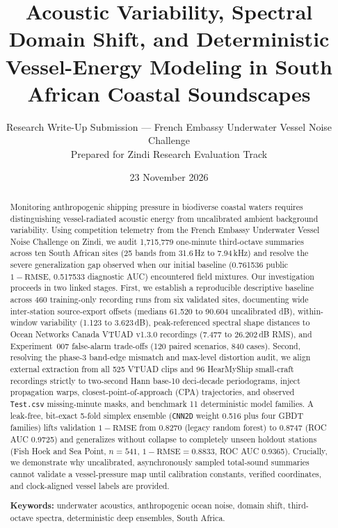 \documentclass[10pt,a4paper]{article}
\title{\vspace{-1.1em}\Large\textbf{Acoustic Variability, Spectral Domain Shift, and Deterministic Vessel-Energy Modeling in South African Coastal Soundscapes}}
\author{Research Write-Up Submission --- French Embassy Underwater Vessel Noise Challenge \\ \small Prepared for Zindi Research Evaluation Track}
\date{23 November 2026}
\begin{document}
\maketitle
\vspace{-1.0em}

\begin{abstract}
Monitoring anthropogenic shipping pressure in biodiverse coastal waters requires distinguishing vessel-radiated acoustic energy from uncalibrated ambient background variability. Using competition telemetry from the French Embassy Underwater Vessel Noise Challenge on Zindi, we audit 1,715,779 one-minute third-octave summaries across ten South African sites (25 bands from 31.6\,Hz to 7.94\,kHz) and resolve the severe generalization gap observed when our initial baseline (0.761536 public $1 - \mathrm{RMSE}$, 0.517533 diagnostic AUC) encountered field mixtures. Our investigation proceeds in two linked stages. First, we establish a reproducible descriptive baseline across 460 training-only recording runs from six validated sites, documenting wide inter-station source-export offsets (medians 61.520 to 90.604 uncalibrated dB), within-window variability (1.123 to 3.623\,dB), peak-referenced spectral shape distances to Ocean Networks Canada VTUAD v1.3.0 recordings (7.477 to 26.202\,dB RMS), and Experiment~007 false-alarm trade-offs (120 paired scenarios, 840 cases). Second, resolving the phase-3 band-edge mismatch and max-level distortion audit, we align external extraction from all 525 VTUAD clips and 96 HearMyShip small-craft recordings strictly to two-second Hann base-10 deci-decade periodograms, inject propagation warps, closest-point-of-approach (CPA) trajectories, and observed \texttt{Test.csv} missing-minute masks, and benchmark 11 deterministic model families. A leak-free, bit-exact 5-fold simplex ensemble (\texttt{CNN2D} weight 0.516 plus four GBDT families) lifts validation $1 - \mathrm{RMSE}$ from 0.8270 (legacy random forest) to 0.8747 (ROC AUC 0.9725) and generalizes without collapse to completely unseen holdout stations (Fish Hoek and Sea Point, $n=541$, $1 - \mathrm{RMSE} = 0.8833$, ROC AUC 0.9365). Crucially, we demonstrate why uncalibrated, asynchronously sampled total-sound summaries cannot validate a vessel-pressure map until calibration constants, verified coordinates, and clock-aligned vessel labels are provided.

\medskip
\noindent\textbf{Keywords:} underwater acoustics, anthropogenic ocean noise, domain shift, third-octave spectra, deterministic deep ensembles, South Africa.
\end{abstract}
\end{document}
